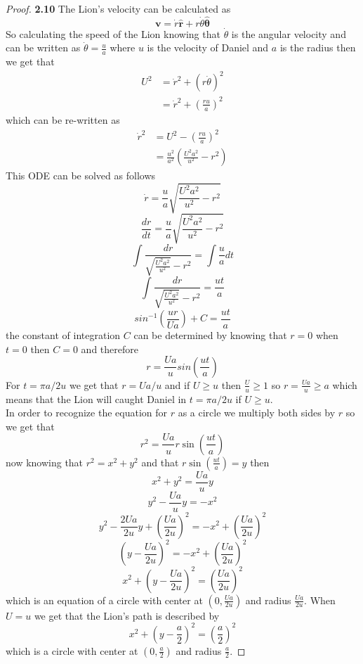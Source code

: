 \documentclass[11pt]{article}
\newcommand{\hatr}{\bm{\hat{r}}}
\newcommand{\hatth}{\bm{\hat{\theta}}}
\begin{document}
    \begin{proof}{\textbf{2.10}}
        The Lion's velocity can be calculated as
        $$\bm{v} = \dot{r}\hatr + r\dot{\theta}\hatth$$
        So calculating the speed of the Lion knowing that $\dot{\theta}$ is the
        angular velocity and can be written as $\dot{\theta} = \frac{u}{a}$
        where $u$ is the velocity of Daniel and $a$ is the radius then we get
        that
        \begin{align*}
            U^2 &= \dot{r}^2 + (r\dot{\theta})^2 \\
                &= \dot{r}^2 + (\frac{ru}{a})^2
        \end{align*}
        which can be re-written as
        \begin{align*}
            \dot{r}^2  &= U^2 - (\frac{ru}{a})^2 \\
                       &= \frac{u^2}{a^2}(\frac{U^2a^2}{u^2} - r^2)
        \end{align*}
        This ODE can be solved as follows
        $$\dot{r}  = \frac{u}{a}\sqrt{\frac{U^2a^2}{u^2} - r^2}$$
        $$\frac{dr}{dt} = \frac{u}{a}\sqrt{\frac{U^2a^2}{u^2} - r^2}$$
        $$\int{\frac{dr}{\sqrt{\frac{U^2a^2}{u^2}} - r^2}} = \int{\frac{u}{a}dt}$$
        $$\int{\frac{dr}{\sqrt{\frac{U^2a^2}{u^2}} - r^2}} = \frac{ut}{a}$$
        $$sin^{-1}(\frac{ur}{Ua}) + C = \frac{ut}{a}$$
        the constant of integration $C$ can be determined by knowing that $r=0$
        when $t=0$ then $C=0$ and therefore
        $$r = \frac{Ua}{u}sin(\frac{ut}{a})$$
        For $t = \pi a /2u$ we get that $r = Ua / u$ and if $U \geq u$ then
        $\frac{U}{u} \geq 1$ so $r = \frac{Ua}{u} \geq a$ which means that the
        Lion will caught Daniel in $t = \pi a /2u$ if $U \geq u$. \\
        In order to recognize the equation for $r$ as a circle we multiply both
        sides by $r$ so we get that 
        $$r^2 = \frac{Ua}{u}r\sin(\frac{ut}{a})$$
        now knowing that $r^2 = x^2 + y^2$ and that $r\sin(\frac{ut}{a}) = y$
        then
        $$x^2 + y^2 = \frac{Ua}{u}y$$
        $$y^2 - \frac{Ua}{u}y = -x^2$$
        $$y^2 - \frac{2Ua}{2u}y + (\frac{Ua}{2u})^2= -x^2 + (\frac{Ua}{2u})^2$$
        $$(y - \frac{Ua}{2u})^2 = -x^2 + (\frac{Ua}{2u})^2$$
        $$x^2 + (y - \frac{Ua}{2u})^2 = (\frac{Ua}{2u})^2$$
        which is an equation of a circle with center at $(0, \frac{Ua}{2u})$
        and radius $\frac{Ua}{2u}$.
        When $U = u$ we get that the Lion's path is described by
        $$x^2 + (y - \frac{a}{2})^2 = (\frac{a}{2})^2$$
        which is a circle with center at $(0, \frac{a}{2})$ and radius
        $\frac{a}{2}$.
    \end{proof}
\end{document}
